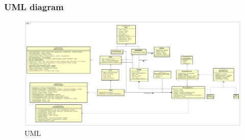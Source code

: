 \clearpage
\subsubsection{UML diagram}
\begin{figure}[h!]
      \begin{center}
            \includegraphics[keepaspectratio, width=16cm]{UML.png}
            \caption{UML}
      \end{center}
\end{figure}
